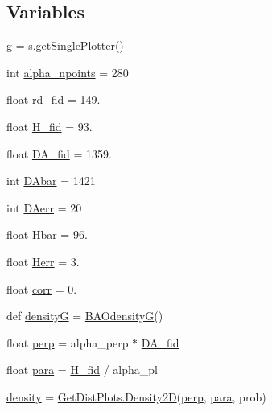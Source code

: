 \subsection*{Variables}
\begin{DoxyCompactItemize}
\item 
\mbox{\hyperlink{namespaceDA-H-BAO_a4d5bf2f95a97dc892ed3da689b90966b}{g}} = s.\+get\+Single\+Plotter()
\item 
int \mbox{\hyperlink{namespaceDA-H-BAO_af0c2ae0bc4a59c068b9ce55eefba82ee}{alpha\+\_\+npoints}} = 280
\item 
float \mbox{\hyperlink{namespaceDA-H-BAO_a41dacefc2e769d16860b7b1a3d3791bb}{rd\+\_\+fid}} = 149.
\item 
float \mbox{\hyperlink{namespaceDA-H-BAO_a7e49116209e7af4e96c5a0ceb1040178}{H\+\_\+fid}} = 93.
\item 
float \mbox{\hyperlink{namespaceDA-H-BAO_ae06900c902984b78a3076f391a5ba380}{D\+A\+\_\+fid}} = 1359.
\item 
int \mbox{\hyperlink{namespaceDA-H-BAO_a9889d0255b14257eb945adff349f6f26}{D\+Abar}} = 1421
\item 
int \mbox{\hyperlink{namespaceDA-H-BAO_a813fbee6081aa3b43d0689b0649bc391}{D\+Aerr}} = 20
\item 
float \mbox{\hyperlink{namespaceDA-H-BAO_af173537092c03b0411d63be083300101}{Hbar}} = 96.
\item 
float \mbox{\hyperlink{namespaceDA-H-BAO_a75e84f2693834da1615495e7698fd48e}{Herr}} = 3.
\item 
float \mbox{\hyperlink{namespaceDA-H-BAO_ad41686071450f48b34d929d96c1deaeb}{corr}} = 0.
\item 
def \mbox{\hyperlink{namespaceDA-H-BAO_a8f4e1fa9290f5d0cfa98586e1450b8d9}{densityG}} = \mbox{\hyperlink{namespaceDA-H-BAO_ad99c99db245ed920a8ce4610595df78f}{B\+A\+OdensityG}}()
\item 
float \mbox{\hyperlink{namespaceDA-H-BAO_a1ef2d11c27ebb2ee813f0915af9e2a4c}{perp}} = alpha\+\_\+perp $\ast$ \mbox{\hyperlink{namespaceDA-H-BAO_ae06900c902984b78a3076f391a5ba380}{D\+A\+\_\+fid}}
\item 
float \mbox{\hyperlink{namespaceDA-H-BAO_a5e40bd0b44054eb96349908addc6068c}{para}} = \mbox{\hyperlink{namespaceDA-H-BAO_a7e49116209e7af4e96c5a0ceb1040178}{H\+\_\+fid}} / alpha\+\_\+pl
\item 
\mbox{\hyperlink{namespaceDA-H-BAO_acc09de89f01f6d1a884ce4b151dbc050}{density}} = \mbox{\hyperlink{classgetdist_1_1densities_1_1Density2D}{Get\+Dist\+Plots.\+Density2D}}(\mbox{\hyperlink{namespaceDA-H-BAO_a1ef2d11c27ebb2ee813f0915af9e2a4c}{perp}}, \mbox{\hyperlink{namespaceDA-H-BAO_a5e40bd0b44054eb96349908addc6068c}{para}}, prob)

\end{DoxyCompactItemize}
